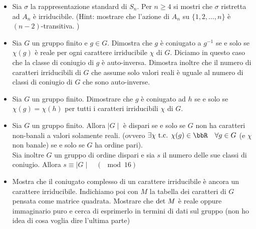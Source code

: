 \documentclass[a4paper,NoNotes,GeneralMath]{stdmdoc}
\begin{document}
\begin{itemize}
		\item Sia $\sigma$ la rappresentazione standard di $S_n$. Per $n \ge 4$ si mostri che $\sigma$ ristretta ad $A_n$ è irriducibile. (Hint: mostrare che l'azione di $A_n$ su $\{ 1, 2, \ldots, n\}$ è $(n-2)$-transitiva. )

		\item Sia $G$ un gruppo finito e $g \in G$. Dimostra che $g$ è coniugato a $g^{-1}$ se e solo se $\chi(g)$ è reale per ogni carattere irriducibile $\chi$ di $G$. Diciamo in questo caso che la classe di coniugio di $g$ è auto-inversa. Dimostra inoltre che il numero di caratteri irriducibili di $G$ che assume solo valori reali è uguale al numero di classi di coniugio di $G$ che sono auto-inverse.

		\item Sia $G$ un gruppo finito. Dimostrare che $g$ è coniugato ad $h$ se e solo se $\chi(g) = \chi(h)$ per tutti i caratteri irriducibili $\chi$ di $G$.

		\item Sia $G$ un gruppo finito. Allora $\mid G \mid$ è dispari se e solo se $G$ non ha caratteri non-banali a valori solamente reali. (ovvero $\exists \chi \tc \chi(g) \in \bbR \quad \forall g \in G$ (e $\chi$ non banale) se e solo se $G$ ha ordine pari). \\
		Sia inoltre $G$ un gruppo di ordine dispari e sia $s$ il numero delle sue classi di coniugio. Allora $s \equiv \mid G \mid \quad (\mod 16)$

		\item Mostra che il coniugato complesso di un carattere irriducibile è ancora un carattere irriducibile. Indichiamo poi con $M$ la tabella dei caratteri di $G$ pensata come matrice quadrata. Mostrare che $\mbox{det } M$ è reale oppure immaginario puro e cerca di esprimerlo in termini di dati sul gruppo (non ho idea di cosa voglia dire l'ultima parte)
	\end{itemize}
\end{document}

